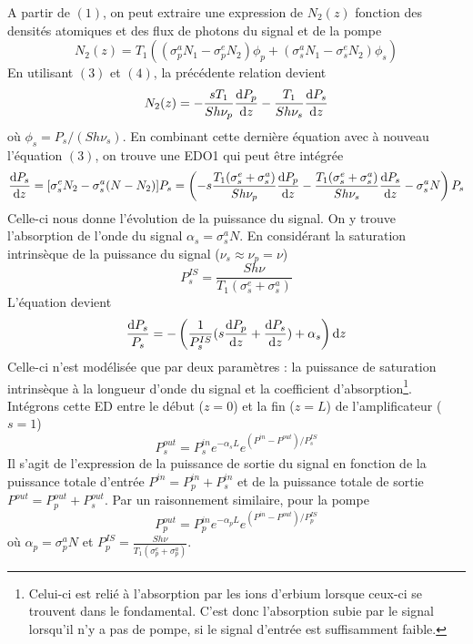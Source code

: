 A partir de $(1)$, on peut extraire une expression de $N_2(z)$ fonction des densités atomiques et 
des flux de photons du signal et de la pompe
\begin{equation}
{N_2}(z) = {T_1}\left( {(\sigma _p^a{N_1} - \sigma _p^e{N_2}){\phi _p} + (\sigma _s^a{N_1} - \sigma _s^e{N_2}){\phi _s}} \right)
\end{equation}
En utilisant $(3)$ et $(4)$, la précédente relation devient
\begin{equation}
N_2(z)  =  - \frac{{s{T_1}}}{{Sh{\nu _p}}}\frac{{{\rm{d}}{P_p}}}{{{\rm{d}}z}} - \frac{{{T_1}}}{{Sh{\nu _s}}}\frac{{{\rm{d}}{P_s}}}{{{\rm{d}}z}}
\end{equation}
où $\phi_s= P_s/(Sh\nu_s)$. En combinant cette dernière équation avec à nouveau l'équation $(3)$, on
trouve une EDO1 qui peut être intégrée
\begin{equation}
\frac{{{\rm{d}}{P_s}}}{{{\rm{d}}z}} = [\sigma _s^e{N_2} - \sigma _s^a(N - {N_2})]{P_s}
= \left( { - s\frac{{{T_1}(\sigma _s^e + \sigma _s^a)}}{{Sh{\nu _p}}}\frac{{{\rm{d}}{P_p}}}{{{\rm{d}}z}} - \frac{{{T_1}(\sigma _s^e + \sigma _s^a)}}{{Sh{\nu _s}}}\frac{{{\rm{d}}{P_s}}}{{{\rm{d}}z}} - \sigma _s^aN} \right){P_s}
\end{equation}
Celle-ci nous donne l'évolution de la puissance du signal. On y trouve l'absorption de l'onde du 
signal $\alpha_s = \sigma_s^aN$. En considérant la saturation intrinsèque de la puissance du signal
($\nu_s\approx\nu_p=\nu$)
\begin{equation}
P_s^{IS} = \frac{{Sh\nu }}{{{T_1}(\sigma _s^e + \sigma _s^a)}}
\end{equation}
L'équation devient
\begin{equation}
\frac{{{\rm{d}}{P_s}}}{{{P_s}}} =  - \left( {\frac{1}{{P_s^{IS}}}(s\frac{{{\rm{d}}{P_p}}}{{{\rm{d}}z}} + \frac{{{\rm{d}}{P_s}}}{{{\rm{d}}z}}) + {\alpha _s}} \right){\rm{d}}z
\end{equation}
Celle-ci n'est modélisée que par deux paramètres : la puissance de saturation intrinsèque à la 
longueur d'onde du signal et la coefficient d'absorption\footnote{Celui-ci est relié à l'absorption
par les ions d'erbium lorsque ceux-ci se trouvent dans le fondamental. C'est donc l'absorption 
subie par le signal lorsqu'il n'y a pas de pompe, si le signal d'entrée est suffisamment faible.}. \\

Intégrons cette ED entre le début ($z=0$) et la fin ($z=L$) de l'amplificateur ($s=1$)
\begin{equation}
P_s^{out} = P_s^{in}{e^{ - {\alpha _s}L}}{e^{({P^{in}} - {P^{out}})/P_s^{IS}}}
\end{equation}
Il s'agit de l'expression de la puissance de sortie du signal en fonction de la puissance totale
d'entrée ${P^{in}} = P_p^{in} + P_s^{in}$ et de la puissance totale de sortie ${P^{out}} = P_p^{out}
+ P_s^{out}$. Par un raisonnement similaire, pour la pompe 
\begin{equation}
P_p^{out} = P_p^{in}{e^{ - {\alpha _p}L}}{e^{({P^{in}} - {P^{out}})/P_p^{IS}}}
\end{equation}
où ${\alpha _p} = \sigma _p^aN$ et $P_p^{IS} = \frac{{Sh\nu }}{{{T_1}(\sigma _p^e + \sigma _p^a)}}$.\\


